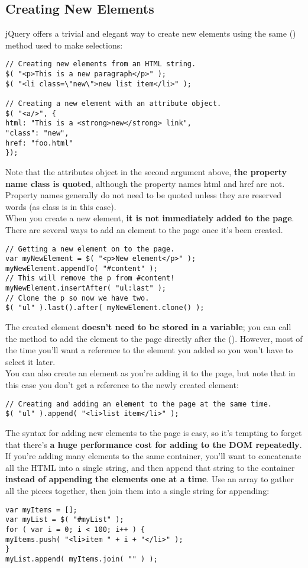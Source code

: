 \documentclass[10pt,letterpaper]{report}
\begin{document}
\subsection{Creating New Elements}
jQuery offers a trivial and elegant way to create new elements using the same \textdollar() method used to make selections:
\begin{lstlisting}
// Creating new elements from an HTML string.
$( "<p>This is a new paragraph</p>" );
$( "<li class=\"new\">new list item</li>" );

// Creating a new element with an attribute object.
$( "<a/>", {
html: "This is a <strong>new</strong> link",
"class": "new",
href: "foo.html"
});
\end{lstlisting}
Note that the attributes object in the second argument above, \textbf{the property name class is quoted}, although the property names html and href are not. Property names generally do not need to be quoted unless they are reserved words (as class is in this case).\\
When you create a new element, \textbf{it is not immediately added to the page}. There are several ways to add an element to the page once it's been created.
\begin{lstlisting}
// Getting a new element on to the page.
var myNewElement = $( "<p>New element</p>" );
myNewElement.appendTo( "#content" );
// This will remove the p from #content!
myNewElement.insertAfter( "ul:last" );
// Clone the p so now we have two.
$( "ul" ).last().after( myNewElement.clone() );
\end{lstlisting}
The created element \textbf{doesn't need to be stored in a variable}; you can call the method to add the element to the page directly after the \textdollar(). However, most of the time you'll want a reference to the element you added so you won't have to select it later.\\
You can also create an element as you're adding it to the page, but note that in this case you don't get a reference to the newly created element:
\begin{lstlisting}
// Creating and adding an element to the page at the same time.
$( "ul" ).append( "<li>list item</li>" );
\end{lstlisting}
The syntax for adding new elements to the page is easy, so it's tempting to forget that there's \textbf{a huge performance cost for adding to the DOM repeatedly}. If you're adding many elements to the same container, you'll want to concatenate all the HTML into a single string, and then append that string to the container \textbf{instead of appending the elements one at a time}. Use an array to gather all the pieces together, then join them into a single string for appending:
\begin{lstlisting}
var myItems = [];
var myList = $( "#myList" );
for ( var i = 0; i < 100; i++ ) {
myItems.push( "<li>item " + i + "</li>" );
}
myList.append( myItems.join( "" ) );
\end{lstlisting}
\end{document}

